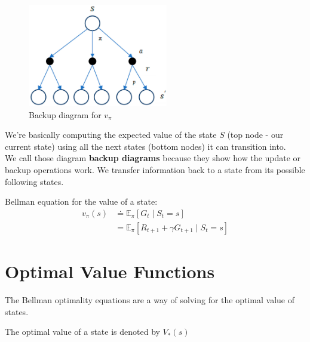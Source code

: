 \begin{table}[H]
    \begin{minipage}{0.45\linewidth}
        \begin{figure}[H]
            \centering
            \includegraphics[height=4.5cm]{Pictures/deep-reinforcement-learning/drl-backup-diagram_v-pi.jpg}
            \caption{Backup diagram for $v_\pi$}
        \end{figure}
    \end{minipage}
    \hfill
    \begin{minipage}{0.45\linewidth}
        We’re basically computing the expected value of the state $S$ (top node - our current state) using all the next states (bottom nodes) it can transition into.\\
        We call those diagram \textbf{backup diagrams} because they show how the update or backup operations work. We transfer information back to a state from its possible following states.
    \end{minipage}
\end{table}

Bellman equation for the value of a state:
\begin{align*}
    v_\pi(s) &\doteq \mathbb{E}_\pi [G_t \mid S_t = s] \\
    &= \mathbb{E}_\pi [R_{t+1} + \gamma G_{t+1} \mid S_t = s]
\end{align*}

\section{Optimal Value Functions \cite{medium-introduction-to-reinforcement-learning-rl-part-3-finite-markov-decision-processes-51e1f8d3ddb7}}

The Bellman optimality equations are a way of solving for the optimal value of states.


The optimal value of a state is denoted by $V_*(s)$



